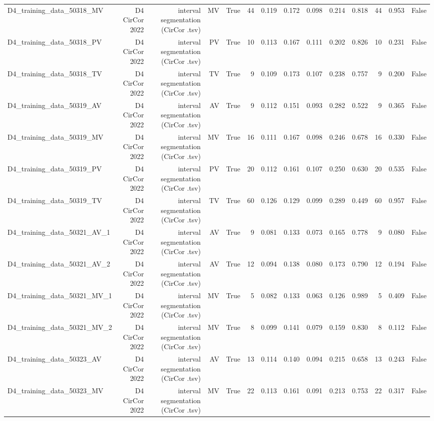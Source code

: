 \begin{table}[htbp]
\begin{tabular}{lrrrrrrrrrrrrr}
    D4\_training\_data\_50318\_MV & D4 CirCor 2022 & interval segmentation (CirCor .tsv) & MV & True & 44 & 0.119 & 0.172 & 0.098 & 0.214 & 0.818 & 44 & 0.953 & False \\
    D4\_training\_data\_50318\_PV & D4 CirCor 2022 & interval segmentation (CirCor .tsv) & PV & True & 10 & 0.113 & 0.167 & 0.111 & 0.202 & 0.826 & 10 & 0.231 & False \\
    D4\_training\_data\_50318\_TV & D4 CirCor 2022 & interval segmentation (CirCor .tsv) & TV & True & 9 & 0.109 & 0.173 & 0.107 & 0.238 & 0.757 & 9 & 0.200 & False \\
    D4\_training\_data\_50319\_AV & D4 CirCor 2022 & interval segmentation (CirCor .tsv) & AV & True & 9 & 0.112 & 0.151 & 0.093 & 0.282 & 0.522 & 9 & 0.365 & False \\
    D4\_training\_data\_50319\_MV & D4 CirCor 2022 & interval segmentation (CirCor .tsv) & MV & True & 16 & 0.111 & 0.167 & 0.098 & 0.246 & 0.678 & 16 & 0.330 & False \\
    D4\_training\_data\_50319\_PV & D4 CirCor 2022 & interval segmentation (CirCor .tsv) & PV & True & 20 & 0.112 & 0.161 & 0.107 & 0.250 & 0.630 & 20 & 0.535 & False \\
    D4\_training\_data\_50319\_TV & D4 CirCor 2022 & interval segmentation (CirCor .tsv) & TV & True & 60 & 0.126 & 0.129 & 0.099 & 0.289 & 0.449 & 60 & 0.957 & False \\
    D4\_training\_data\_50321\_AV\_1 & D4 CirCor 2022 & interval segmentation (CirCor .tsv) & AV & True & 9 & 0.081 & 0.133 & 0.073 & 0.165 & 0.778 & 9 & 0.080 & False \\
    D4\_training\_data\_50321\_AV\_2 & D4 CirCor 2022 & interval segmentation (CirCor .tsv) & AV & True & 12 & 0.094 & 0.138 & 0.080 & 0.173 & 0.790 & 12 & 0.194 & False \\
    D4\_training\_data\_50321\_MV\_1 & D4 CirCor 2022 & interval segmentation (CirCor .tsv) & MV & True & 5 & 0.082 & 0.133 & 0.063 & 0.126 & 0.989 & 5 & 0.409 & False \\
    D4\_training\_data\_50321\_MV\_2 & D4 CirCor 2022 & interval segmentation (CirCor .tsv) & MV & True & 8 & 0.099 & 0.141 & 0.079 & 0.159 & 0.830 & 8 & 0.112 & False \\
    D4\_training\_data\_50323\_AV & D4 CirCor 2022 & interval segmentation (CirCor .tsv) & AV & True & 13 & 0.114 & 0.140 & 0.094 & 0.215 & 0.658 & 13 & 0.243 & False \\
    D4\_training\_data\_50323\_MV & D4 CirCor 2022 & interval segmentation (CirCor .tsv) & MV & True & 22 & 0.113 & 0.161 & 0.091 & 0.213 & 0.753 & 22 & 0.317 & False \\

\end{tabular}
\end{table}
